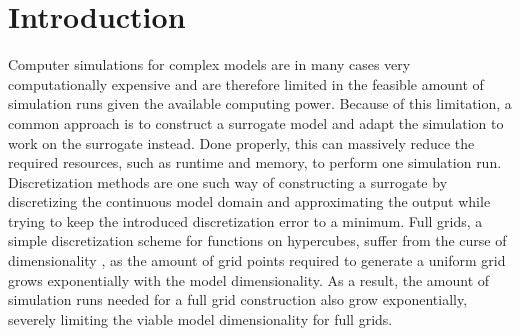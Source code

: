 \documentclass[
  a4paper,  %
  twoside,  %
  bibliography=totoc,
  headsepline,
  cleardoublepage=empty,
  parskip=half,
  draft=false
]{scrbook}
\begin{document}
\renewcommand*{\chapterpagestyle}{scrplain}
\pagestyle{scrheadings}
\pagestyle{scrheadings}
\ihead[]{}
\chead[]{}
\ohead[]{\headmark}
\cfoot[]{}
\ifoot[]{}

































%
%


\chapter{Introduction}
\label{chap:c1}

\setcounter{page}{1}

Computer simulations for complex models are in many cases very computationally expensive and are therefore limited in the feasible amount of simulation runs given the available computing power.
Because of this limitation, a common approach is to construct a surrogate model and adapt the simulation to work on the surrogate instead.
Done properly, this can massively reduce the required resources, such as runtime and memory, to perform one simulation run.
Discretization methods \cite{Stetter1973} are one such way of constructing a surrogate by discretizing the continuous model domain and approximating the output while trying to keep the introduced discretization error to a minimum.
Full grids, a simple discretization scheme for functions on hypercubes, suffer from the curse of dimensionality \cite{Bellman1961}, as the amount of grid points required to generate a uniform grid grows exponentially with the model dimensionality.
As a result, the amount of simulation runs needed for a full grid construction also grow exponentially, severely limiting the viable model dimensionality for full grids.
\end{document}
